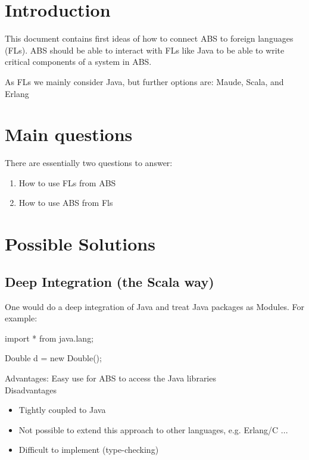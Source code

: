\documentclass[a4paper,11pt,final]{article}
\title{\deliverableTitle}
\author{Jan Sch\"{a}fer \and Peter Y. H. Wong}
\begin{document}
\maketitle 

\section{Introduction}
This document contains first ideas of how to
connect ABS to foreign languages (FLs).
ABS should be able to interact with FLs like
Java to be able to write critical components of a system
in ABS. 

As FLs we mainly consider Java, but further
options are: Maude, Scala, and Erlang

\section{Main questions}
There are essentially two questions to answer:
\begin{enumerate}
  \item How to use FLs from ABS
  \item How to use ABS from Fls
\end{enumerate}

\section{Possible Solutions}

\subsection{Deep Integration (the Scala way)}
One would do a deep integration of Java and treat Java packages as Modules.
For example:

\begin{absexamplen}
import * from java.lang;

{
  Double d = new Double();
}
\end{absexamplen}   

\noindent Advantages: Easy use for ABS to access the Java libraries \\

\noindent Disadvantages
\begin{itemize}
  \item Tightly coupled to Java
  \item Not possible to extend this approach to other languages, e.g. Erlang/C
  ...
  \item Difficult to implement (type-checking)
\end{itemize}
  
\end{document}
